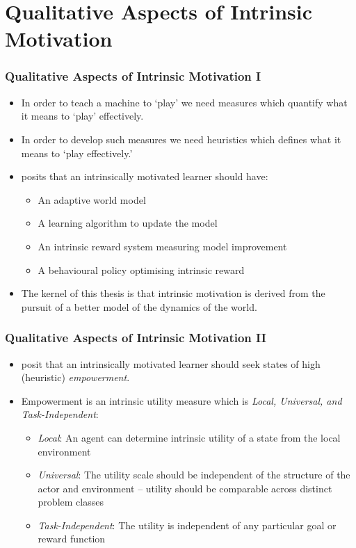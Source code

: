 \documentclass[aspectratio=169]{beamer}
\begin{document}
\section{Qualitative Aspects of Intrinsic Motivation}
\begin{frame}
	\frametitle{Qualitative Aspects of Intrinsic Motivation I}
	\begin{itemize}
		\item In order to teach a machine to `play' we need measures which quantify what it means to `play' effectively. \vspace{.5em}
		\item In order to develop such measures we need heuristics which defines what it means to `play effectively.' \vspace{0.5em} \pause
		\item \citet{schmidhuber2010formal} posits that an intrinsically motivated learner should have:
		\begin{itemize}
			\item An adaptive world model
			\item A learning algorithm to update the model
			\item An intrinsic reward system measuring model improvement
			\item A behavioural policy optimising intrinsic reward\pause
		\end{itemize}\vspace{0.5em}
		\item The kernel of this thesis is that intrinsic motivation is derived from the pursuit of a better model of the dynamics of the world. 
	\end{itemize}
\end{frame}

\begin{frame}
	\frametitle{Qualitative Aspects of Intrinsic Motivation II}
	\begin{itemize}
		\item \citet{salge2014empowerment} posit that an intrinsically motivated learner should seek states of high (heuristic) \textit{empowerment}.
		\item Empowerment is an intrinsic utility measure which is \textit{Local, Universal, and Task-Independent}:\pause\vspace{.5em}
		\begin{itemize}
			\item \textit{Local}: An agent can determine intrinsic utility of a state from the local environment\pause\vspace{.5em}
			\item \textit{Universal}: The utility scale should be independent of the structure of the actor and environment -- utility should be comparable across distinct problem classes\pause\vspace{.5em}
			\item \textit{Task-Independent}: The utility is independent of any particular goal or reward function
		\end{itemize}
	\end{itemize}
\end{frame}
\end{document}
